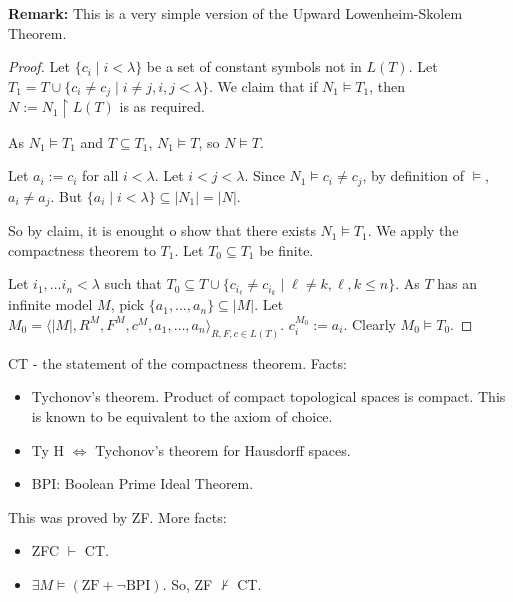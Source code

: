 \documentclass{report}
\begin{document}


\noindent \textbf{Remark:} This is a very simple version of the Upward Lowenheim-Skolem Theorem.
\begin{proof}
    Let $\{ c_i \mid i < \lambda\}$ be a set of constant symbols not in $L(T)$. Let $T_1 = T \cup \{c_i \neq c_j \mid i \neq j, i,j < \lambda\}$. We claim that if $N_1 \models T_1$, then $N := N_1 \restriction L(T)$ is as required.

    As $N_1 \models T_1$ and $T \subseteq T_1$, $N_1 \models T$, so $N \models T$.

    Let $a_i := c_i$ for all $i < \lambda$. Let $i < j < \lambda$. Since $N_1 \models c_i \neq c_j$, by definition of $\models$, $a_i \neq a_j$. But $\{a_i \mid i < \lambda\} \subseteq |N_1| = |N|$. 

    So by claim, it is enought o show that there exists $N_1 \models T_1$. We apply the compactness theorem to $T_1$. Let $T_0 \subseteq T_1$ be finite.
    
    Let $i_1, \ldots i_n < \lambda$ such that $T_0 \subseteq T \cup \{c_{i_\ell} \neq c_{i_k} \mid \ell \neq k, \ell, k \leq n\}$. As $T$ has an infinite model $M$, pick $\{a_1, \ldots, a_n \} \subseteq |M|$. Let $M_0 = \langle |M|, R^M, F^M, c^M, a_1, \ldots, a_n \rangle_{R, F, c \in L(T)}$. $c_i^{M_0} := a_i$. Clearly $M_0 \models T_0$.
\end{proof}

\noindent CT - the statement of the compactness theorem. Facts:
\begin{itemize}
    \item Tychonov's theorem. Product of compact topological spaces is compact. This is known to be equivalent to the axiom of choice.
    \item Ty H $\iff$ Tychonov's theorem for Hausdorff spaces.
    \item BPI: Boolean Prime Ideal Theorem. 
\end{itemize}

\noindent This was proved by ZF. More facts:
\begin{itemize}
    \item ZFC $\vdash$ CT.
    \item $\exists M \models (\text{ZF} + \neg\text{BPI})$. So, ZF $\not\vdash$ CT.
\end{itemize}
\end{document}
